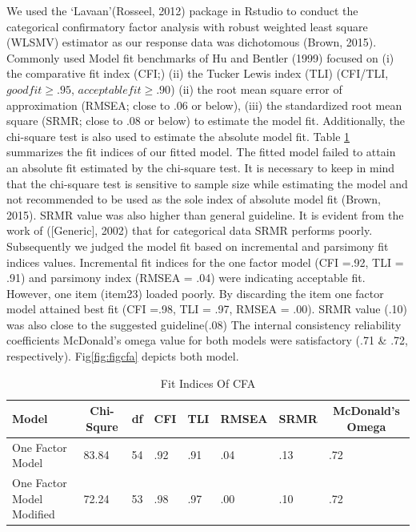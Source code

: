 \documentclass[
  man]{apa6}
\begin{document}
We used the `Lavaan'(Rosseel, 2012) package in Rstudio to conduct the categorical confirmatory factor analysis with robust weighted least square (WLSMV) estimator as our response data was dichotomous (Brown, 2015). Commonly used Model fit benchmarks of Hu and Bentler (1999) focused on (i) the comparative fit index (CFI;) (ii) the Tucker Lewis index (TLI) (CFI/TLI, \(goodfit \geq .95\), \(acceptable fit\geq .90\)) (ii) the root mean square error of approximation (RMSEA; close to .06 or below), (iii) the standardized root mean square (SRMR; close to .08 or below) to estimate the model fit. Additionally, the chi-square test is also used to estimate the absolute model fit. Table \ref{tab:tabCfa} summarizes the fit indices of our fitted model. The fitted model failed to attain an absolute fit estimated by the chi-square test. It is necessary to keep in mind that the chi-square test is sensitive to sample size while estimating the model and not recommended to be used as the sole index of absolute model fit (Brown, 2015). SRMR value was also higher than general guideline. It is evident from the work of ({[}Generic{]}, 2002) that for categorical data SRMR performs poorly. Subsequently we judged the model fit based on incremental and parsimony fit indices values. Incremental fit indices for the one factor model (CFI =.92, TLI = .91) and parsimony index (RMSEA = .04) were indicating acceptable fit. However, one item (item23) loaded poorly. By discarding the item one factor model attained best fit (CFI =.98, TLI = .97, RMSEA = .00). SRMR value (.10) was also close to the suggested guideline(.08) The internal consistency reliability coefficients McDonald's omega value for both models were satisfactory (.71 \& .72, respectively). Fig\ref{fig:figcfa} depicts both model.

\begin{table}[tbp]

\begin{center}
\begin{threeparttable}

\caption{\label{tab:tabCfa}Fit Indices Of CFA}

\begin{tabular}{llllllll}
\toprule
Model & \multicolumn{1}{c}{Chi-Squre} & \multicolumn{1}{c}{df} & \multicolumn{1}{c}{CFI} & \multicolumn{1}{c}{TLI} & \multicolumn{1}{c}{RMSEA} & \multicolumn{1}{c}{SRMR} & \multicolumn{1}{c}{McDonald's Omega}\\
\midrule
One Factor Model & 83.84 & 54 & .92 & .91 & .04 & .13 & .72\\
One Factor Model Modified & 72.24 & 53 & .98 & .97 & .00 & .10 & .72\\
\bottomrule
\end{tabular}

\end{threeparttable}
\end{center}

\end{table}
\end{document}
